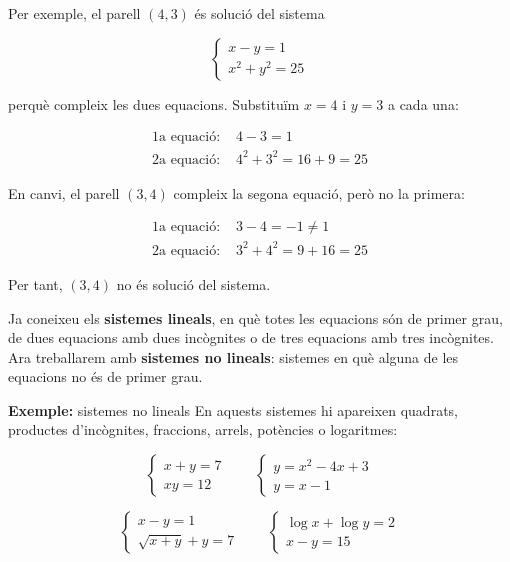 Per exemple, el parell $(4,3)$ és solució del sistema

\[
\begin{cases}
x-y=1\\
x^2+y^2=25
\end{cases}
\]

perquè compleix les dues equacions. Substituïm $x=4$ i $y=3$ a cada una:

\[
\begin{aligned}
\text{1a equació: }&4-3=1\\
\text{2a equació: }&4^2+3^2=16+9=25
\end{aligned}
\]

En canvi, el parell $(3,4)$ compleix la segona equació, però no la primera:

\[
\begin{aligned}
\text{1a equació: }&3-4=-1\neq 1\\
\text{2a equació: }&3^2+4^2=9+16=25
\end{aligned}
\]

Per tant, $(3,4)$ no és solució del sistema.

Ja coneixeu els \textbf{sistemes lineals}, en què totes les equacions són de primer grau, de dues equacions amb dues incògnites o de tres equacions amb tres incògnites. Ara treballarem amb \textbf{sistemes no lineals}: sistemes en què alguna de les equacions no és de primer grau.

\begin{exemple}{\textbf{Exemple:} sistemes no lineals}
En aquests sistemes hi apareixen quadrats, productes d'incògnites, fraccions, arrels, potències o logaritmes:

\[
\begin{cases}
x+y=7\\
xy=12
\end{cases}
\qquad
\begin{cases}
y=x^2-4x+3\\
y=x-1
\end{cases}
\]

\[
\begin{cases}
x-y=1\\
\sqrt{x+y}+y=7
\end{cases}
\qquad
\begin{cases}
\log x+\log y=2\\
x-y=15
\end{cases}
\]
\end{exemple}

